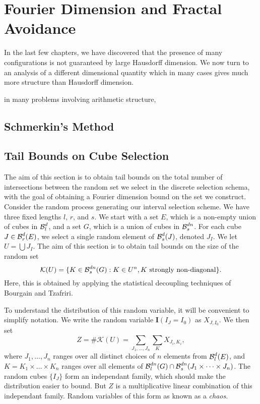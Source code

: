 
\chapter{Fourier Dimension and Fractal Avoidance}
\label{ch:RoughSets}


In the last few chapters, we have discovered that the presence of many configurations is not guaranteed by large Hausdorff dimension. We now turn to an analysis of a different dimensional quantity which in many cases gives much more structure than Hausdorff dimension. 

in many problems involving arithmetic structure,




\section{Schmerkin's Method}






\section{Tail Bounds on Cube Selection}

The aim of this section is to obtain tail bounds on the total number of intersections between the random set we select in the discrete selection schema, with the goal of obtaining a Fourier dimension bound on the set we construct. Consider the random process generating our interval selection scheme. We have three fixed lengths $l$, $r$, and $s$. We start with a set $E$, which is a non-empty union of cubes in $\operatorname{\mathcal{B}}^d_l$, and a set $G$, which is a union of cubes in $\operatorname{\mathcal{B}}^{dn}_s$. For each cube $J \in \operatorname{\mathcal{B}}^d_r(E)$, we select a single random element of $\operatorname{\mathcal{B}}^d_s(J)$, denoted $J_I$. We let $U = \bigcup J_I$. The aim of this section is to obtain tail bounds on the size of the random set
%
\[ \mathcal{K}(U) = \{ K \in \operatorname{\mathcal{B}}^{dn}_s(G): K \in U^n, K\ \text{strongly non-diagonal} \}. \]
%
Here, this is obtained by applying the statistical decoupling techniques of Bourgain and Tzafriri.

To understand the distribution of this random variable, it will be convenient to simplify notation. We write the random variable $\mathbf{I}(I_J = I_0)$ as $X_{J,I_0}$. We then set
%
\[ Z = \# \mathcal{K}(U) = \sum_{J_1, \dots, J_n} \sum_K X_{J_i,K_i}, \]
%
where $J_1, \dots, J_n$ ranges over all distinct choices of $n$ elements from $\operatorname{\mathcal{B}}^d_l(E)$, and $K = K_1 \times \dots \times K_n$ ranges over all elements of $\operatorname{\mathcal{B}}^{dn}_l(G) \cap \operatorname{\mathcal{B}}^{dn}_s(J_1 \times \dots \times J_n)$. The random cubes $\{ I_J \}$ form an independant family, which should make the distribution easier to bound. But $Z$ is a multiplicative linear combination of this independant family. Random variables of this form as known as a \emph{chaos}.

